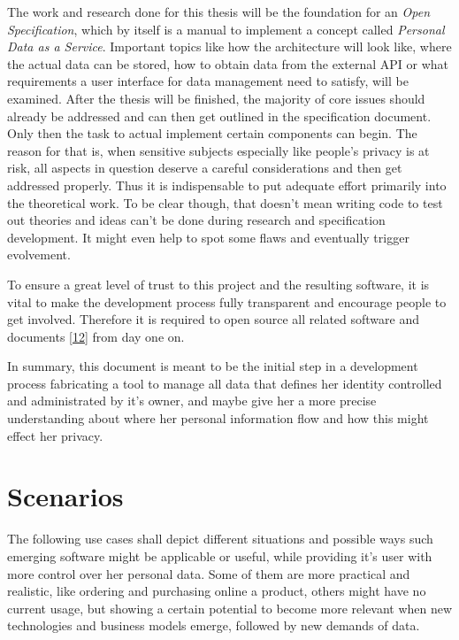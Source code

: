 \documentclass[12pt,english,a4paper,titlepage,cleardoublepage=empty,dottedtoc]{report}
\begin{document}
The work and research done for this thesis will be the foundation for an
\emph{Open Specification}, which by itself is a manual to implement a
concept called \emph{Personal Data as a Service}. Important topics like
how the architecture will look like, where the actual data can be
stored, how to obtain data from the external API or what requirements a
user interface for data management need to satisfy, will be examined.
After the thesis will be finished, the majority of core issues should
already be addressed and can then get outlined in the specification
document. Only then the task to actual implement certain components can
begin. The reason for that is, when sensitive subjects especially like
people's privacy is at risk, all aspects in question deserve a careful
considerations and then get addressed properly. Thus it is indispensable
to put adequate effort primarily into the theoretical work. To be clear
though, that doesn't mean writing code to test out theories and ideas
can't be done during research and specification development. It might
even help to spot some flaws and eventually trigger evolvement.

To ensure a great level of trust to this project and the resulting
software, it is vital to make the development process fully transparent
and encourage people to get involved. Therefore it is required to open
source all related software and documents
{[}\protect\hyperlink{ref-repo_2016_pdaas-spec}{12}{]} from day one on.

In summary, this document is meant to be the initial step in a
development process fabricating a tool to manage all data that defines
her identity controlled and administrated by it's owner, and maybe give
her a more precise understanding about where her personal information
flow and how this might effect her privacy.

\section{Scenarios}\label{scenarios}

The following use cases shall depict different situations and possible
ways such emerging software might be applicable or useful, while
providing it's user with more control over her personal data. Some of
them are more practical and realistic, like ordering and purchasing
online a product, others might have no current usage, but showing a
certain potential to become more relevant when new technologies and
business models emerge, followed by new demands of data.
\end{document}
